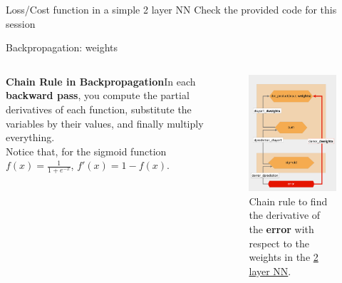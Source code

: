 \documentclass{beamer}
\begin{document}
\begin{frame}
    \begin{Exercise}{Loss/Cost function in a simple 2 layer NN}
        \label{Ex:2layer}
        Check the provided code for this session
    \end{Exercise}
\end{frame}

\begin{frame}{Backpropagation: weights}
    \begin{columns}
        \begin{column}{0.6\linewidth}     
            {\bf Chain Rule in Backpropagation}In each {\bf backward pass}, you compute the partial derivatives of each function, substitute the variables by their values, and finally multiply everything.
            \\[10pt]
            Notice that, for the sigmoid function $f(x)=\frac{1}{1+e^{-x}}$, $f'(x)=1-f(x)$.
        \end{column}
        \begin{column}{0.4\linewidth}
            \begin{figure}
                \includegraphics[width=0.7\linewidth]{WeightGradient.png}
                \caption{Chain rule to find the derivative of the {\bf error} with respect to the weights in the \href{https://realpython.com/python-ai-neural-network/}{2 layer NN}.}
                \label{Fig:Training2Layer}
            \end{figure}
        \end{column}
     \end{columns}
\end{frame}
\end{document}
